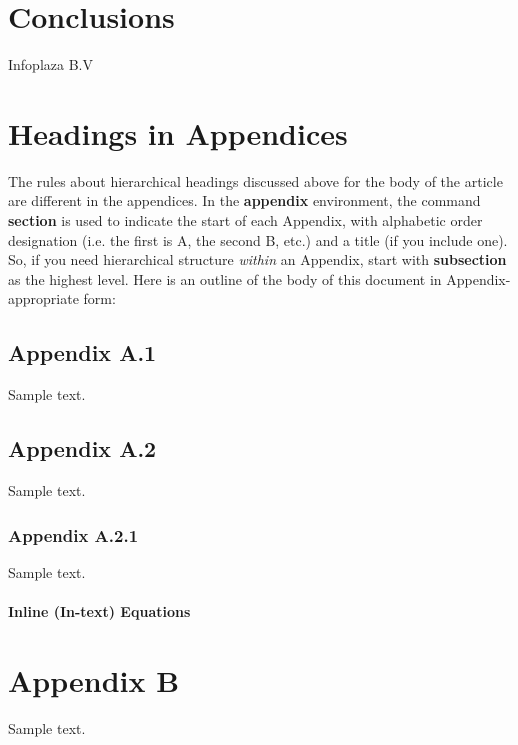 \documentclass[acmtog, authorversion]{acmart}
\begin{document}
\section{Conclusions}



\begin{acks}
Infoplaza B.V
\end{acks}




\appendix
\section{Headings in Appendices}
The rules about hierarchical headings discussed above for the body
of the article are different in the appendices. In the
\textbf{appendix} environment, the command \textbf{section} is
used to indicate the start of each Appendix, with alphabetic order
designation (i.e. the first is A, the second B, etc.) and a title
(if you include one).  So, if you need hierarchical structure
\textit{within} an Appendix, start with \textbf{subsection} as the
highest level. Here is an outline of the body of this document in
Appendix-appropriate form:
\subsection{Appendix A.1}
Sample text.
\subsection{Appendix A.2}
Sample text.
\subsubsection{Appendix A.2.1}
Sample text.

\paragraph{Inline (In-text) Equations}
\section{Appendix B}
Sample text.
\end{document}
